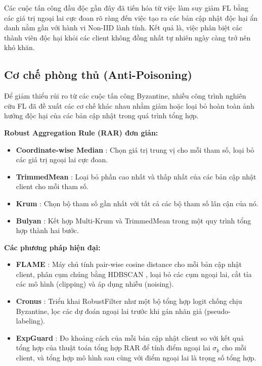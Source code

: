 Các cuộc tấn công đầu độc gần đây đã tiến hóa từ việc làm suy giảm FL bằng các giá trị ngoại lai cực đoan rõ ràng đến việc tạo ra các bản cập nhật độc hại ẩn danh nằm gần với hành vi Non-IID lành tính. Kết quả là, việc phân biệt các thành viên độc hại khỏi các client không đồng nhất tự nhiên ngày càng trở nên khó khăn.

\subsection{Cơ chế phòng thủ (Anti-Poisoning)}
\label{sec:defense}

Để giảm thiểu rủi ro từ các cuộc tấn công Byzantine, nhiều công trình nghiên cứu FL đã đề xuất các cơ chế khác nhau nhằm giảm hoặc loại bỏ hoàn toàn ảnh hưởng độc hại của các bản cập nhật trong quá trình tổng hợp.

\textbf{Robust Aggregation Rule (RAR) đơn giản:}
\begin{itemize}
    \item \textbf{Coordinate-wise Median} \cite{yin2018fedcomed}: Chọn giá trị trung vị cho mỗi tham số, loại bỏ các giá trị ngoại lai cực đoan.
    \item \textbf{TrimmedMean} \cite{yin2018fedcomed}: Loại bỏ phần cao nhất và thấp nhất của các bản cập nhật client cho mỗi tham số.
    \item \textbf{Krum} \cite{blanchard2017krum}: Chọn bộ tham số gần nhất với tất cả các bộ tham số lân cận của nó.
    \item \textbf{Bulyan} \cite{guerraoui2018bulyan}: Kết hợp Multi-Krum và TrimmedMean trong một quy trình tổng hợp thành hai bước.
\end{itemize}

\textbf{Các phương pháp hiện đại:}
\begin{itemize}
    \item \textbf{FLAME} \cite{nguyen2022flame}: Máy chủ tính pair-wise cosine distance cho mỗi bản cập nhật client, phân cụm chúng bằng HDBSCAN \cite{mcinnes2017hdbscan}, loại bỏ các cụm ngoại lai, cắt tỉa các mô hình (clipping) và áp dụng nhiễu (noising).
    \item \textbf{Cronus} \cite{chang2019cronus}: Triển khai RobustFilter như một bộ tổng hợp logit chống chịu Byzantine, lọc các dự đoán ngoại lai trước khi gán nhãn giả (pseudo-labeling).
    \item \textbf{ExpGuard} \cite{roux2025byzantine}: Đo khoảng cách của mỗi bản cập nhật client so với kết quả tổng hợp của thuật toán tổng hợp RAR để tính điểm ngoại lai $\sigma_k$ cho mỗi client, và tổng hợp mô hình sau cùng với điểm ngoại lai là trọng số tổng hợp.
\end{itemize}

